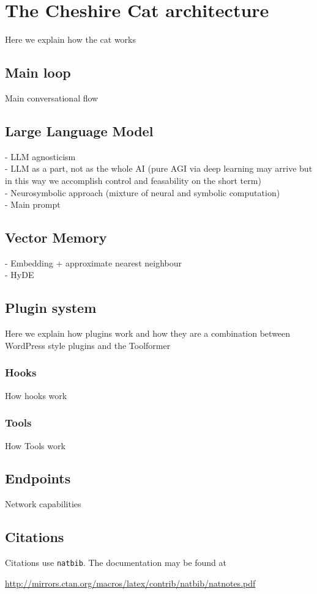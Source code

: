 \documentclass{article}
\begin{document}
\section{The Cheshire Cat architecture}

Here we explain how the cat works

\subsection{Main loop}
Main conversational flow

\subsection{Large Language Model}
- LLM agnosticism\\
- LLM as a part, not as the whole AI (pure AGI via deep learning may arrive but in this way we accomplish control and feasability on the short term)\\
- Neurosymbolic approach (mixture of neural and symbolic computation)\\
- Main prompt

\subsection{Vector Memory}
- Embedding + approximate nearest neighbour\\
- HyDE

\subsection{Plugin system}
Here we explain how plugins work and how they are a combination between WordPress style plugins and the Toolformer

\subsubsection{Hooks}
How hooks work

\subsubsection{Tools}
How Tools work

\subsection{Endpoints}
Network capabilities

\subsection{Citations}
Citations use \verb+natbib+. The documentation may be found at
\begin{center}
	\url{http://mirrors.ctan.org/macros/latex/contrib/natbib/natnotes.pdf}
\end{center}
\end{document}
